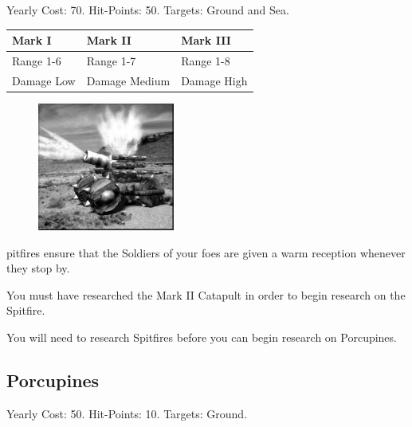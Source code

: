 

\begin{center}
	Yearly Cost: 70. Hit-Points: 50. Targets: Ground and Sea.
\end{center}

\begin{tabular}{ | p{1.3in} | p{1.3in} | p{1.3in} |}
	\hline
	\textbf{Mark I}	& \textbf{Mark II} & \textbf{Mark III} \\ \hline
	Range 1-6	& Range 1-7 & Range 1-8 \\ \hline
	Damage Low	& Damage Medium & Damage High \\ \hline
\end{tabular}

\begin{figure}
	\vspace{-20pt}
	\begin{center}
		\includegraphics[width=0.4\textwidth]{Aspitfire}
	\end{center}
\end{figure}

pitfires ensure that the Soldiers of your foes are given a warm reception whenever they stop by.

You must have researched the Mark II Catapult in order to begin research on the Spitfire. 

You will need to research Spitfires before you can begin research on Porcupines.

\clearpage

\subsection{Porcupines}


\begin{center}
Yearly Cost: 50. Hit-Points: 10. Targets: Ground.
\end{center}

